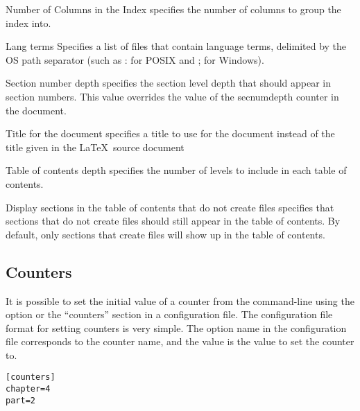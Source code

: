 \begin{configuration}{Number of Columns in the Index}
specifies the number of columns to group the index into.
\end{configuration}

\begin{configuration}{Lang terms}
Specifies a list of files that contain language terms, delimited by the
OS path separator (such as : for POSIX and ; for Windows).
\end{configuration}

\begin{configuration}{Section number depth}
specifies the section level depth that should appear in section numbers.
This value overrides the value of the secnumdepth counter in the document.
\end{configuration}

\begin{configuration}{Title for the document}
specifies a title to use for the document instead of the title given
in the \LaTeX\ source document
\end{configuration}

\begin{configuration}{Table of contents depth}
specifies the number of levels to include in each table of contents.
\end{configuration}

\begin{configuration}{Display sections in the table of contents that do not create files}
specifies that sections that do not create files should still appear in the
table of contents.  By default, only sections that create files will show
up in the table of contents.
\end{configuration}


\subsection{Counters}

It is possible to set the initial value of a counter from the
command-line using the  option or the
``counters'' section in a configuration file.  The configuration
file format for setting counters is very simple.  The option name
in the configuration file corresponds to the counter name, and the
value is the value to set the counter to.  
\begin{verbatim}
[counters]
chapter=4
part=2
\end{verbatim}

